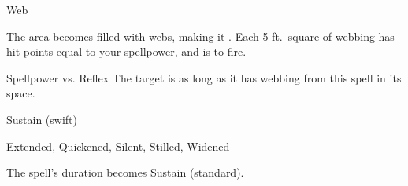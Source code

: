 \begin{spellsection}{Web}
\begin{spellheader}
\end{spellheader}
\begin{spellcontent}
\begin{spelltargetinginfo}
\end{spelltargetinginfo}
\begin{spelleffects}
\spelleffect
The area becomes filled with webs, making it .
Each 5-ft.\ square of webbing has hit points equal to your spellpower, and is  to fire.
\begin{spellattack}{Spellpower vs. Reflex}
\spellsuccess The target is \immobilized as long as it has webbing from this spell in its space.
\end{spellattack}
\spelldur Sustain (swift)
\end{spelleffects}
\end{spellcontent}
\begin{spellfooter}
 Extended, Quickened, Silent, Stilled, Widened
\end{spellfooter}
\begin{spellsubcontent}
\begin{spellcantrip}
The spell's duration becomes Sustain (standard).
\end{spellcantrip}
\end{spellsubcontent}
\end{spellsection}
